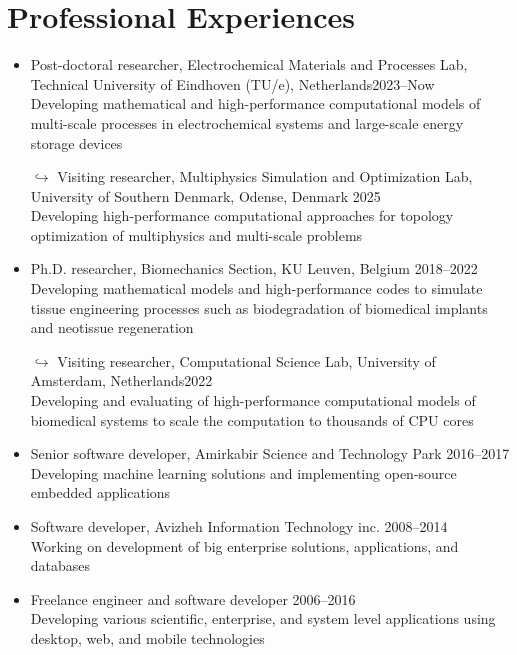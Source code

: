 \documentclass{cv}
\begin{document}

\section{Professional Experiences}

\begin{itemize}[itemsep=-0.2ex]
\item
Post-doctoral researcher, Electrochemical Materials and Processes Lab, Technical University of Eindhoven (TU/e), Netherlands\hfill 2023--Now
\\
Developing mathematical and high-performance computational models of multi-scale processes in electrochemical systems and large-scale energy storage devices

$\hookrightarrow$ Visiting researcher, Multiphysics Simulation and Optimization Lab, University of Southern Denmark, Odense, Denmark  \hfill 2025
\\
Developing high-performance computational approaches for topology optimization of multiphysics and multi-scale problems 
\item
Ph.D. researcher, Biomechanics Section, KU Leuven, Belgium \hfill 2018--2022
\\
Developing mathematical models and high-performance codes to simulate tissue engineering processes such as biodegradation of biomedical implants and neotissue regeneration 

$\hookrightarrow$ Visiting researcher, Computational Science Lab, University of Amsterdam, Netherlands\hfill 2022
\\
Developing and evaluating of high-performance computational models of biomedical systems to scale the computation to thousands of CPU cores

\item
Senior software developer, Amirkabir Science and Technology Park \hfill 2016--2017
\\
Developing machine learning solutions and implementing open-source embedded applications
\item Software developer, Avizheh Information Technology inc. \hfill 2008--2014
\\
Working on development of big enterprise solutions, applications, and databases
\item
Freelance engineer and software developer \hfill 2006--2016
\\
Developing various scientific, enterprise, and system level applications using desktop, web, and mobile technologies

\end{itemize}
\end{document}

